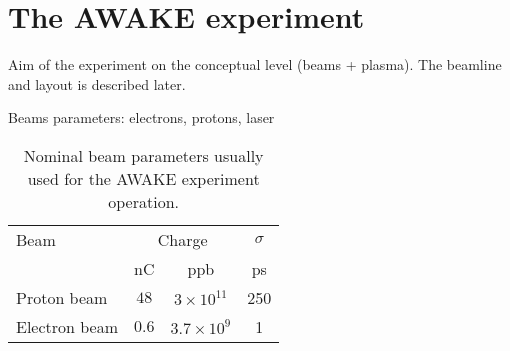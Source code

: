 \section[The AWAKE experiment]{The AWAKE experiment}

Aim of the experiment on the conceptual level (beams + plasma). The beamline and layout is described later.

Beams parameters: electrons, protons, laser

\begin{table}[ht]
  \centering
    \begin{tabular}{l c c c}
    \toprule
    Beam  & \multicolumn{2}{c}{Charge} & $\sigma$\\
          & nC & ppb & ps\\
    \midrule
    Proton beam								& $48$	  & $3\times10^{11}$	& 250	\\
    Electron beam							& $0.6$	  & $3.7\times10^{9}$	& 1		\\
    \bottomrule
    \end{tabular}
  \caption{Nominal beam parameters usually used for the AWAKE experiment operation.} \label{beam_param_exp:tab}
\end{table}
